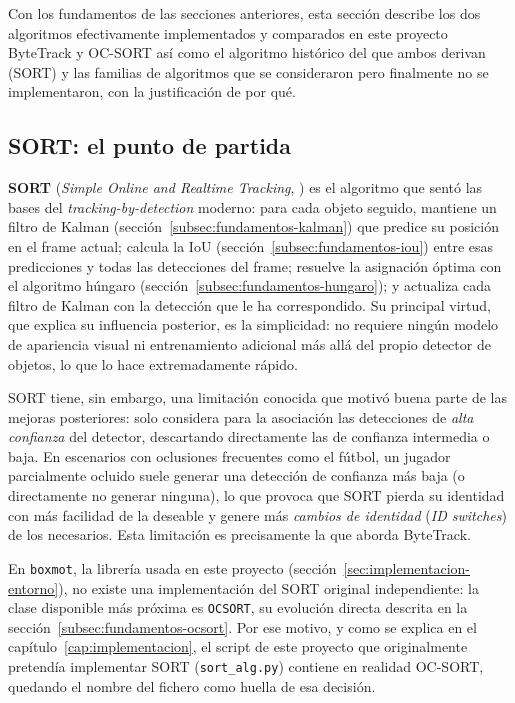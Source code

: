 Con los fundamentos de las secciones anteriores, esta sección describe los
dos algoritmos efectivamente implementados y comparados en este proyecto
ByteTrack y OC-SORT así como el algoritmo histórico del que ambos
derivan (SORT) y las familias de algoritmos que se consideraron pero
finalmente no se implementaron, con la justificación de por qué.

\subsection{SORT: el punto de partida}
\label{subsec:fundamentos-sort}

\textbf{SORT} (\emph{Simple Online and Realtime Tracking},
\citealp{bewley2016sort, ultralytics2026trackingtools}) es el algoritmo que sentó las bases del
\emph{tracking-by-detection} moderno: para cada objeto seguido, mantiene un
filtro de Kalman (sección~\ref{subsec:fundamentos-kalman}) que predice su
posición en el frame actual; calcula la IoU (sección~\ref{subsec:fundamentos-iou})
entre esas predicciones y todas las detecciones del frame; resuelve la
asignación óptima con el algoritmo húngaro
(sección~\ref{subsec:fundamentos-hungaro}); y actualiza cada filtro de
Kalman con la detección que le ha correspondido. Su principal virtud, que
explica su influencia posterior, es la simplicidad: no requiere ningún
modelo de apariencia visual ni entrenamiento adicional más allá del propio
detector de objetos, lo que lo hace extremadamente rápido.

SORT tiene, sin embargo, una limitación conocida que motivó buena parte de
las mejoras posteriores: solo considera para la asociación las detecciones
de \emph{alta confianza} del detector, descartando directamente las de
confianza intermedia o baja. En escenarios con oclusiones frecuentes como
el fútbol, un jugador parcialmente ocluido suele generar una detección de
confianza más baja (o directamente no generar ninguna), lo que provoca que
SORT pierda su identidad con más facilidad de la deseable y genere más
\emph{cambios de identidad} (\emph{ID switches}) de los necesarios. Esta
limitación es precisamente la que aborda ByteTrack.

En \texttt{boxmot}, la librería usada en este proyecto
(sección~\ref{sec:implementacion-entorno}), no existe una implementación
del SORT original independiente: la clase disponible más próxima es
\texttt{OCSORT}, su evolución directa descrita en la
sección~\ref{subsec:fundamentos-ocsort}. Por ese motivo, y como se explica
en el capítulo~\ref{cap:implementacion}, el script de este proyecto que
originalmente pretendía implementar SORT (\texttt{sort\_alg.py}) contiene en
realidad OC-SORT, quedando el nombre del fichero como huella de
esa decisión.

